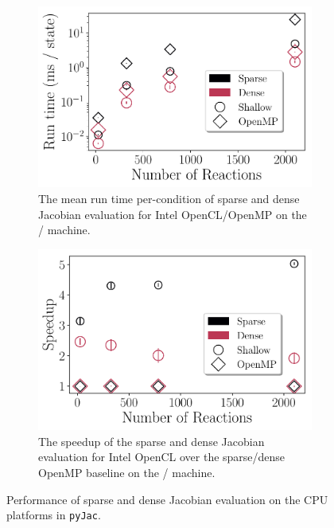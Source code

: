 \documentclass[12pt,number,sort&compress,preprint]{elsarticle}
\begin{document}
\begin{figure}[htbp]
\begin{subfigure}[t]{0.48\linewidth}
      \includegraphics[width=\textwidth]{sparse_vs_dense_sse.pdf}
      \caption{The mean run time per-condition of sparse and dense Jacobian evaluation for Intel OpenCL\slash OpenMP on the \sse/ machine.}
      \label{F:sparse_vs_dense_sse}
  \end{subfigure}
  \hfill
  \begin{subfigure}[t]{0.48\linewidth}
      \includegraphics[width=\textwidth]{sparse_vs_dense_see_speedup.pdf}
      \caption{The speedup of the sparse and dense Jacobian evaluation for Intel OpenCL over the sparse\slash dense OpenMP baseline on the \sse/ machine.}
      \label{F:sparse_vs_dense_sse_speedup}
  \end{subfigure}
  \caption{Performance of sparse and dense Jacobian evaluation on the CPU platforms in \texttt{pyJac}.}
  \label{F:jacobian_perfomance}
\end{figure}
\end{document}
